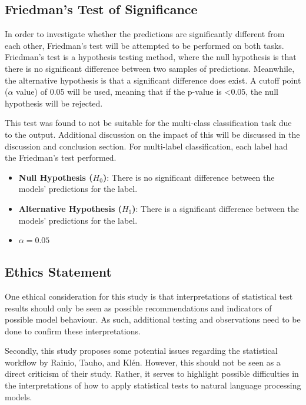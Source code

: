 \documentclass[10.7pt, onecolumn]{article}
\begin{document}
\subsection{Friedman's Test of Significance}
In order to investigate whether the predictions are significantly different from each other, Friedman's test will be attempted to be performed on both tasks. Friedman's test is a hypothesis testing method, where the null hypothesis is that there is no significant difference between two samples of predictions\cite{HOFFMAN2015421}. Meanwhile, the alternative hypothesis is that a significant difference does exist. A cutoff point ($\alpha$ value) of 0.05 will be used, meaning that if the p-value is <0.05, the null hypothesis will be rejected.

This test was found to not be suitable for the multi-class classification task due to the output. Additional discussion on the impact of this will be discussed in the discussion and conclusion section. For multi-label classification, each label had the Friedman's test performed.

\begin{itemize}
  \item \textbf{Null Hypothesis (\(H_0\))}: There is no significant difference between the models' predictions for the label.

  \item \textbf{Alternative Hypothesis (\(H_1\))}: There is a significant difference between the models' predictions for the label.

  \item \( \alpha = 0.05 \)
\end{itemize}

\subsection{Ethics Statement}

One ethical consideration for this study is that interpretations of statistical test results should only be seen as possible recommendations and indicators of possible model behaviour. As such, additional testing and observations need to be done to confirm these interpretations.

Secondly, this study proposes some potential issues regarding the statistical workflow by Rainio, Tauho, and Klén\cite{statsBased}. However, this should not be seen as a direct criticism of their study. Rather, it serves to highlight possible difficulties in the interpretations of how to apply statistical tests to natural language processing models.
\end{document}
